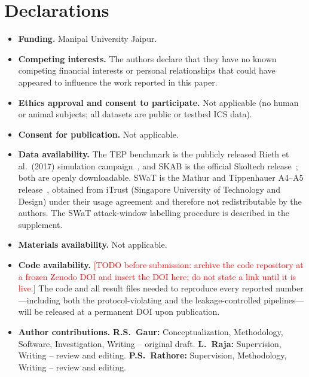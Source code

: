 \documentclass[pdflatex,sn-mathphys-num]{sn-jnl}
\theoremstyle{thmstyleone}
\theoremstyle{thmstyletwo}
\theoremstyle{thmstylethree}
\begin{document}
\section*{Declarations}
\begin{itemize}
  \item \textbf{Funding.} Manipal University Jaipur.
  \item \textbf{Competing interests.} The authors declare that they have no known
    competing financial interests or personal relationships that could have appeared
    to influence the work reported in this paper.
  \item \textbf{Ethics approval and consent to participate.} Not applicable
    (no human or animal subjects; all datasets are public or testbed ICS data).
  \item \textbf{Consent for publication.} Not applicable.
  \item \textbf{Data availability.} The TEP benchmark is the publicly released
    Rieth et al.\ (2017) simulation campaign~\cite{rieth2017tep}, and SKAB is the
    official Skoltech release~\cite{katser2020skab}; both are openly downloadable.
    SWaT is the Mathur and Tippenhauer A4--A5 release~\cite{mathur2016swat,goh2016swat},
    obtained from iTrust (Singapore University of Technology and Design) under their
    usage agreement and therefore not redistributable by the authors. The
    SWaT attack-window labelling procedure is described in the supplement.
  \item \textbf{Materials availability.} Not applicable.
  \item \textbf{Code availability.} \textcolor{red}{[TODO before submission: archive the
    code repository at a frozen Zenodo DOI and insert the DOI here; do not state a link
    until it is live.]} The code and all result files
    needed to reproduce every reported number---including both the protocol-violating
    and the leakage-controlled pipelines---will be released at a permanent DOI upon
    publication.
  \item \textbf{Author contributions.} \textbf{R.S.~Gaur:} Conceptualization,
    Methodology, Software, Investigation, Writing -- original draft.
    \textbf{L.~Raja:} Supervision, Writing -- review and editing.
    \textbf{P.S.~Rathore:} Supervision, Methodology, Writing -- review and editing.
\end{itemize}


\end{document}
